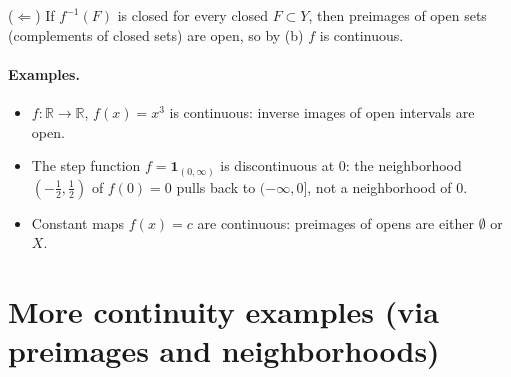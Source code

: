 \documentclass[12pt,a4paper]{article}
\begin{document}
($\Leftarrow$) If $f^{-1}(F)$ is closed for every closed $F\subset Y$, then preimages of open sets (complements of closed sets) are open, so by (b) $f$ is continuous.

\paragraph{Examples.}
\begin{itemize}
	\item $f:\mathbb{R}\to\mathbb{R}$, $f(x)=x^3$ is continuous: inverse images of open intervals are open.
	\item The step function $f=\mathbf{1}_{(0,\infty)}$ is discontinuous at $0$: the neighborhood $(-\tfrac12,\tfrac12)$ of $f(0)=0$ pulls back to $(-\infty,0]$, not a neighborhood of $0$.
	\item Constant maps $f(x)=c$ are continuous: preimages of opens are either $\emptyset$ or $X$.
\end{itemize}
\section*{More continuity examples (via preimages and neighborhoods)}
\end{document}
